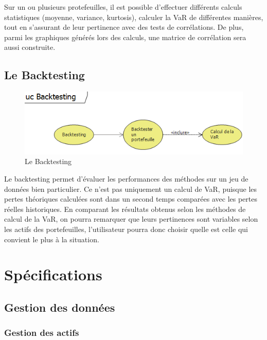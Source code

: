 \documentclass[a4paper]{report}
\begin{document}
Sur un ou plusieurs protefeuilles, il est possible d'effectuer différents calculs statistiques (moyenne, variance, kurtosis), calculer la VaR de différentes manières, tout en s'assurant de leur pertinence avec des tests de corrélations.
De plus, parmi les graphiques générés lors des calculs, une matrice de corrélation sera aussi construite.

\subsection{Le Backtesting}
\begin{figure}[H]
  \center
  \includegraphics[width=1\textwidth]{Backtesting.png}
  \caption{Le Backtesting}
\end{figure}

Le backtesting permet d'évaluer les performances des méthodes sur un jeu de données bien particulier.
Ce n'est pas uniquement un calcul de VaR, puisque les pertes théoriques calculées sont dans un second temps comparées avec les pertes réelles historiques.
En comparant les résultats obtenus selon les méthodes de calcul de la VaR, on pourra remarquer que leurs pertinences  sont variables selon les actifs des portefeuilles, l'utilisateur pourra donc choisir quelle est celle qui convient le plus à la situation.

\FloatBarrier 







\section{Spécifications}


\subsection{Gestion des données}

\subsubsection{Gestion des actifs}
\end{document}

